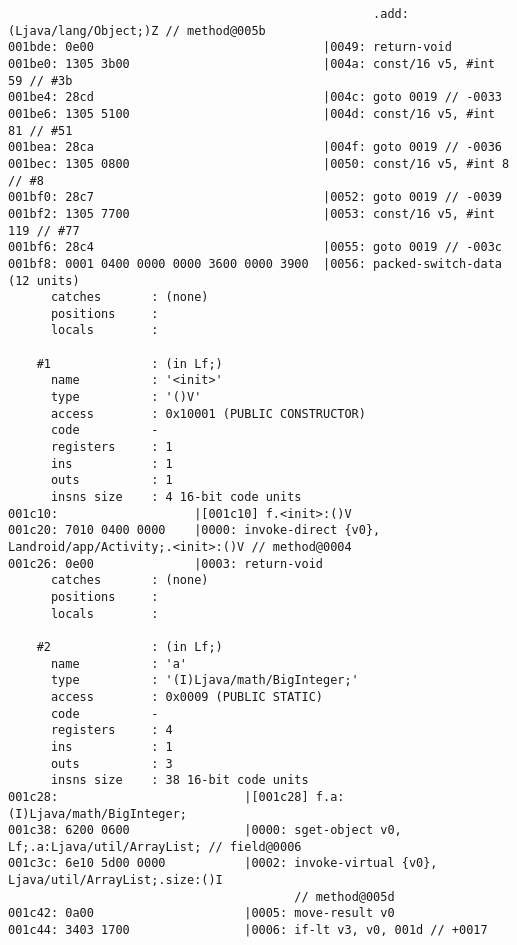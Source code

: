 \begin{lstlisting}
                                                   .add:(Ljava/lang/Object;)Z // method@005b
001bde: 0e00                                |0049: return-void
001be0: 1305 3b00                           |004a: const/16 v5, #int 59 // #3b
001be4: 28cd                                |004c: goto 0019 // -0033
001be6: 1305 5100                           |004d: const/16 v5, #int 81 // #51
001bea: 28ca                                |004f: goto 0019 // -0036
001bec: 1305 0800                           |0050: const/16 v5, #int 8 // #8
001bf0: 28c7                                |0052: goto 0019 // -0039
001bf2: 1305 7700                           |0053: const/16 v5, #int 119 // #77
001bf6: 28c4                                |0055: goto 0019 // -003c
001bf8: 0001 0400 0000 0000 3600 0000 3900  |0056: packed-switch-data (12 units)
      catches       : (none)
      positions     :
      locals        :

    #1              : (in Lf;)
      name          : '<init>'
      type          : '()V'
      access        : 0x10001 (PUBLIC CONSTRUCTOR)
      code          -
      registers     : 1
      ins           : 1
      outs          : 1
      insns size    : 4 16-bit code units
001c10:                   |[001c10] f.<init>:()V
001c20: 7010 0400 0000    |0000: invoke-direct {v0}, Landroid/app/Activity;.<init>:()V // method@0004
001c26: 0e00              |0003: return-void
      catches       : (none)
      positions     :
      locals        :

    #2              : (in Lf;)
      name          : 'a'
      type          : '(I)Ljava/math/BigInteger;'
      access        : 0x0009 (PUBLIC STATIC)
      code          -
      registers     : 4
      ins           : 1
      outs          : 3
      insns size    : 38 16-bit code units
001c28:                          |[001c28] f.a:(I)Ljava/math/BigInteger;
001c38: 6200 0600                |0000: sget-object v0, Lf;.a:Ljava/util/ArrayList; // field@0006
001c3c: 6e10 5d00 0000           |0002: invoke-virtual {v0}, Ljava/util/ArrayList;.size:()I
                                        // method@005d
001c42: 0a00                     |0005: move-result v0
001c44: 3403 1700                |0006: if-lt v3, v0, 001d // +0017






\end{lstlisting}

